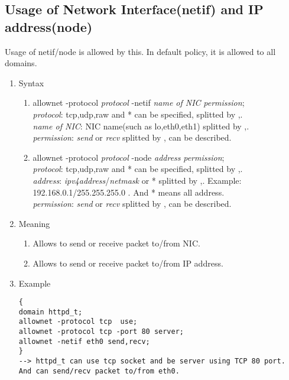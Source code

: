 \documentclass{article}
\begin{document}
\subsection{Usage of Network Interface(netif) and IP address(node)}
Usage of netif/node is allowed by this. In default policy, it is allowed
to all domains.
\begin{enumerate}
 \item Syntax\\
       \begin{enumerate}
	\item allownet -protocol {\it protocol} -netif {\it name of NIC} {\it
	      permission};\\
	      {\it protocol}: tcp,udp,raw and * can be specified, splitted by ,.\\
	      {\it name of NIC}: NIC name(such as lo,eth0,eth1) splitted by ,.\\
	      {\it permission}: {\it send} or {\it recv} splitted by , can
	      be described.       
	\item allownet -protocol {\it protocol} -node {\it address} {\it
	      permission};\\
	      {\it protocol}: tcp,udp,raw and * can be specified, splitted by ,.\\
	      {\it address}: {\it ipv4address}/{\it netmask} or * splitted by
	      ,. Example: 192.168.0.1/255.255.255.0 . And * means all address.\\
	      {\it permission}: {\it send} or {\it recv} splitted by , can
	      be described. 
       \end{enumerate}
 \item Meaning\\
       \begin{enumerate}
	\item    Allows to send or receive packet to/from NIC. 
	\item  Allows to send or receive packet to/from IP address. 
       \end{enumerate}
 \item Example\\

\begin{verbatim}
{
domain httpd_t;
allownet -protocol tcp  use;
allownet -protocol tcp -port 80 server;
allownet -netif eth0 send,recv;
}
--> httpd_t can use tcp socket and be server using TCP 80 port.
And can send/recv packet to/from eth0.
\end{verbatim}
\end{enumerate}
\end{document}
